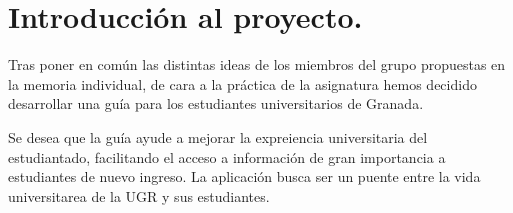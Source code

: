 \section{Introducción al proyecto.}

Tras poner en común las distintas ideas de los miembros del grupo propuestas en la memoria individual, de cara a la práctica de la asignatura hemos decidido desarrollar una guía para los estudiantes universitarios de Granada.

Se desea que la guía ayude a mejorar la expreiencia universitaria del estudiantado, facilitando el acceso a información de gran importancia a estudiantes de nuevo ingreso. La aplicación busca ser un puente entre la vida universitarea de la UGR y sus estudiantes.
